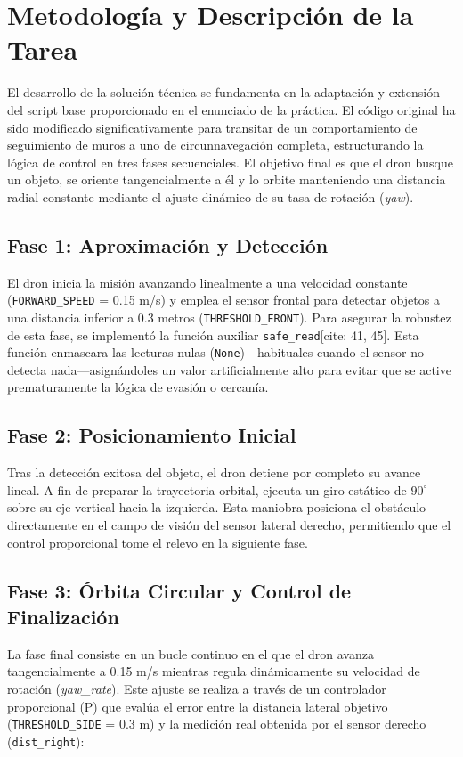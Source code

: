 \documentclass[12pt,a4paper]{article}
\begin{document}
\section{Metodología y Descripción de la Tarea}
El desarrollo de la solución técnica se fundamenta en la adaptación y extensión del script base proporcionado en el enunciado de la práctica. El código original ha sido modificado significativamente para transitar de un comportamiento de seguimiento de muros a uno de circunnavegación completa, estructurando la lógica de control en tres fases secuenciales. El objetivo final es que el dron busque un objeto, se oriente tangencialmente a él y lo orbite manteniendo una distancia radial constante mediante el ajuste dinámico de su tasa de rotación (\textit{yaw}).

\subsection{Fase 1: Aproximación y Detección}
El dron inicia la misión avanzando linealmente a una velocidad constante (\texttt{FORWARD\_SPEED} = 0.15 m/s) y emplea el sensor frontal para detectar objetos a una distancia inferior a 0.3 metros (\texttt{THRESHOLD\_FRONT}). Para asegurar la robustez de esta fase, se implementó la función auxiliar \texttt{safe\_read}[cite: 41, 45]. Esta función enmascara las lecturas nulas (\texttt{None})—habituales cuando el sensor no detecta nada—asignándoles un valor artificialmente alto para evitar que se active prematuramente la lógica de evasión o cercanía.

\subsection{Fase 2: Posicionamiento Inicial}
Tras la detección exitosa del objeto, el dron detiene por completo su avance lineal. A fin de preparar la trayectoria orbital, ejecuta un giro estático de $90^\circ$ sobre su eje vertical hacia la izquierda. Esta maniobra posiciona el obstáculo directamente en el campo de visión del sensor lateral derecho, permitiendo que el control proporcional tome el relevo en la siguiente fase.

\subsection{Fase 3: Órbita Circular y Control de Finalización}
La fase final consiste en un bucle continuo en el que el dron avanza tangencialmente a 0.15 m/s mientras regula dinámicamente su velocidad de rotación (\textit{yaw\_rate}). Este ajuste se realiza a través de un controlador proporcional (P) que evalúa el error entre la distancia lateral objetivo (\texttt{THRESHOLD\_SIDE} = 0.3 m) y la medición real obtenida por el sensor derecho (\texttt{dist\_right}):
\end{document}
